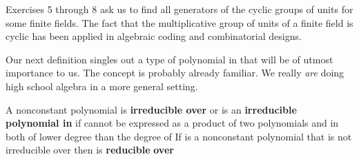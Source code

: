 \documentclass[11pt,oneside]{article}
\begin{document}
\begin{BookBody}
Exercises 5 through 8 ask us to find all generators of the cyclic groups of units for some finite fields. The fact that the multiplicative group of units of a finite field is cyclic has been applied in algebraic coding and combinatorial designs.


\noindent Our next definition singles out a type of polynomial in  that will be of utmost importance to us. The concept is probably already familiar. We really\textit{ are} doing high school algebra in a more general setting.

 A nonconstant polynomial  is\textbf{ irreducible over}  or is an\textbf{ irreducible} \textbf{polynomial in}  if  cannot be expressed as a product  of two polynomials  and  in  both of lower degree than the degree of  If  is a nonconstant polynomial that is not irreducible over  then  is\textbf{ reducible} \textbf{over} \BookEnd{\blacksquare}

\end{BookBody}

\BookNarrativetrue
\end{document}

